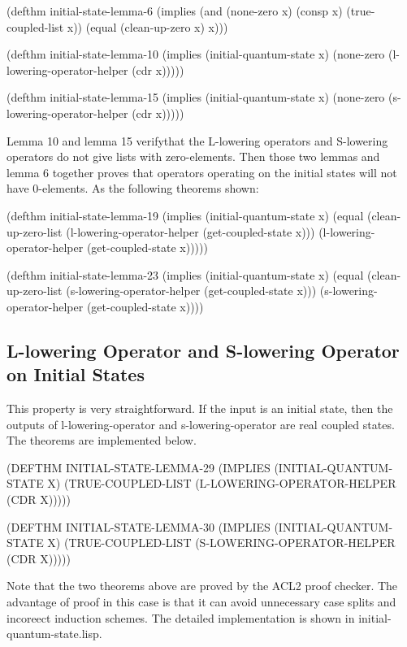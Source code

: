 \documentclass[12pt,journal,compsoc]{IEEEtran}
\begin{document}
\begin{acl2-lst}
(defthm initial-state-lemma-6
 (implies (and (none-zero x)
	   (consp x)
	   (true-coupled-list x))
  (equal (clean-up-zero x) x)))

(defthm initial-state-lemma-10
 (implies (initial-quantum-state x)
  (none-zero 
   (l-lowering-operator-helper (cdr x)))))

(defthm initial-state-lemma-15
 (implies (initial-quantum-state x)
  (none-zero 
   (s-lowering-operator-helper (cdr x)))))
\end{acl2-lst}

Lemma 10 and lemma 15 verifythat the L-lowering operators and S-lowering operators do not give lists with zero-elements. Then those two lemmas and lemma 6 together proves that operators operating on the initial states  will not have 0-elements. As the following theorems shown:

\begin{acl2-lst}
(defthm initial-state-lemma-19 
 (implies (initial-quantum-state x)
  (equal (clean-up-zero-list
	  (l-lowering-operator-helper
	   (get-coupled-state x)))
   (l-lowering-operator-helper 
    (get-coupled-state x)))))

(defthm initial-state-lemma-23 
 (implies (initial-quantum-state x)
  (equal (clean-up-zero-list
	  (s-lowering-operator-helper
	   (get-coupled-state x)))
   (s-lowering-operator-helper 
    (get-coupled-state x))))
\end{acl2-lst}

\subsection{L-lowering Operator and S-lowering Operator on Initial States}

This property is very straightforward. If the input is an initial state, then the outputs of l-lowering-operator and s-lowering-operator are real coupled states. The theorems are implemented below.

\begin{acl2-lst}
(DEFTHM
 INITIAL-STATE-LEMMA-29
 (IMPLIES (INITIAL-QUANTUM-STATE X)
  (TRUE-COUPLED-LIST 
     (L-LOWERING-OPERATOR-HELPER (CDR X)))))

(DEFTHM
 INITIAL-STATE-LEMMA-30
 (IMPLIES (INITIAL-QUANTUM-STATE X)
  (TRUE-COUPLED-LIST 
     (S-LOWERING-OPERATOR-HELPER (CDR X)))))
\end{acl2-lst}

Note that the two theorems above are proved by the ACL2 proof checker. The advantage of proof in this case is that it can avoid unnecessary case splits and incoreect induction schemes. The detailed implementation is shown in initial-quantum-state.lisp.
\end{document}
